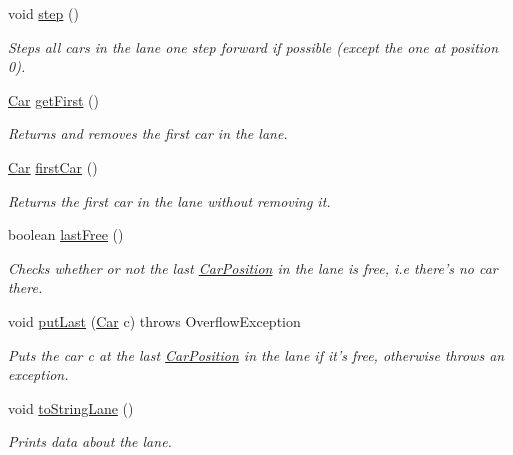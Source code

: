 \begin{DoxyCompactItemize}
\item 
void \hyperlink{class_lane_a85e5eb030e32bc0825be9f3e942e5ccc}{step} ()
\begin{DoxyCompactList}\small\item\em Steps all cars in the lane one step forward if possible (except the one at position 0). \end{DoxyCompactList}\item 
\hyperlink{class_car}{Car} \hyperlink{class_lane_aac5f6634752c76e0e46358fe8dd896ba}{get\+First} ()
\begin{DoxyCompactList}\small\item\em Returns and removes the first car in the lane. \end{DoxyCompactList}\item 
\hyperlink{class_car}{Car} \hyperlink{class_lane_a9ab36dbd97899be31b4f5c28d7969e85}{first\+Car} ()
\begin{DoxyCompactList}\small\item\em Returns the first car in the lane without removing it. \end{DoxyCompactList}\item 
boolean \hyperlink{class_lane_a30c3819ef177ddab0ba45e7145babd38}{last\+Free} ()
\begin{DoxyCompactList}\small\item\em Checks whether or not the last \hyperlink{class_car_position}{Car\+Position} in the lane is free, i.\+e there's no car there. \end{DoxyCompactList}\item 
void \hyperlink{class_lane_aea316343730ee43e3dc3ba660cd46469}{put\+Last} (\hyperlink{class_car}{Car} c)  throws Overflow\+Exception 
\begin{DoxyCompactList}\small\item\em Puts the car c at the last \hyperlink{class_car_position}{Car\+Position} in the lane if it's free, otherwise throws an exception. \end{DoxyCompactList}\item 
\hypertarget{class_lane_a62510f601eff0ac72dc5f95c876a8563}{void \hyperlink{class_lane_a62510f601eff0ac72dc5f95c876a8563}{to\+String\+Lane} ()}\label{class_lane_a62510f601eff0ac72dc5f95c876a8563}

\begin{DoxyCompactList}\small\item\em Prints data about the lane. \end{DoxyCompactList}\end{DoxyCompactItemize}
